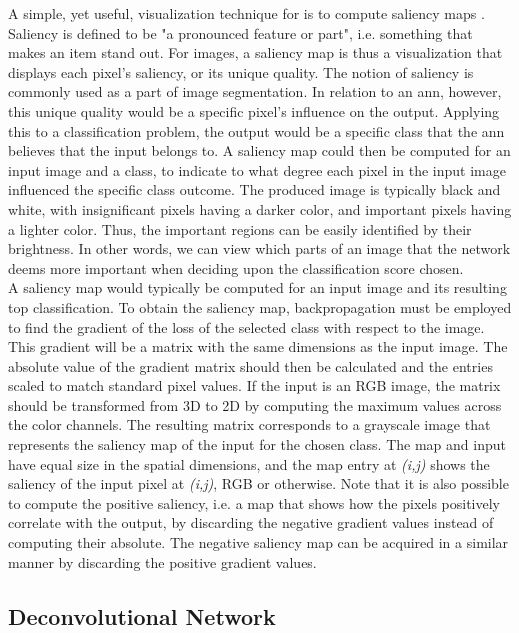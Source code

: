 A simple, yet useful, visualization technique for  is to compute saliency maps \cite{salience}. Saliency is defined to be "a pronounced feature or part", i.e. something that makes an item stand out. For images, a saliency map is thus a visualization that displays each pixel's saliency, or its unique quality. The notion of saliency is commonly used as a part of image segmentation. In relation to an \acrshort{ann}, however, this unique quality would be a specific pixel's influence on the output. Applying this to a classification problem, the output would be a specific class that the \acrshort{ann} believes that the input belongs to. A saliency map could then be computed for an input image and a class, to indicate to what degree each pixel in the input image influenced the specific class outcome. The produced image is typically black and white, with insignificant pixels having a darker color, and important pixels having a lighter color. Thus, the important regions can be easily identified by their brightness. In other words, we can view which parts of an image that the network deems more important when deciding upon the classification score chosen. \\

\noindent A saliency map would typically be computed for an input image and its resulting top classification. To obtain the saliency map, backpropagation must be employed to find the gradient of the loss of the selected class with respect to the image. This gradient will be a matrix with the same dimensions as the input image. The absolute value of the gradient matrix should then be calculated and the entries scaled to match standard pixel values. If the input is an RGB image, the matrix should be transformed from 3D to 2D by computing the maximum values across the color channels. The resulting matrix corresponds to a grayscale image that represents the saliency map of the input for the chosen class. The map and input have equal size in the spatial dimensions, and the map entry at \textit{(i,j)} shows the saliency of the input pixel at \textit{(i,j)}, RGB or otherwise. Note that it is also possible to compute the positive saliency, i.e. a map that shows how the pixels positively correlate with the output, by discarding the negative gradient values instead of computing their absolute. The negative saliency map can be acquired in a similar manner by discarding the positive gradient values.

\subsection{Deconvolutional Network} \label{sec:deconv-net}

